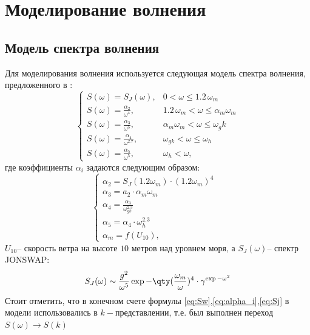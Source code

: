\section{Моделирование волнения}
\label{model}
\subsection{Модель спектра волнения}

Для моделирования волнения используется следующая модель спектра волнения, предложенного в \cite{Karaev2}: 
\begin{equation}
	\label{eq:Sw}
	\begin{cases}
		S(\omega)=S_J(\omega), &  0<\omega\leq 1.2\,\omega_m\\
		S(\omega)= \frac{\alpha_2}{\omega^4}, &  1.2 \,\omega_m < \omega \leq \alpha_m \omega_m\\
		S(\omega)= \frac{\alpha_3}{\omega^5}, &   \alpha_m \omega_m< \omega \leq \omega_gk\\
		S(\omega)= \frac{\alpha_4}{\omega^{2.7}}, & \omega_{gk}<\omega\leq \omega_h\\
		S(\omega)= \frac{\alpha_5}{\omega^5}, & \omega_h<\omega,
	\end{cases}
\end{equation}
где коэффициенты $\alpha_i$ задаются следующим образом:
\begin{equation}
	\label{eq:alpha_i}
	\begin{cases}
		\alpha_2=S_J(1.2 \omega_m)\cdot (1.2 \omega_m)^4 \\
		\alpha_3=a_2\cdot \alpha_m \omega_m \\
		\alpha_4= \frac{\alpha_3}{\omega^{2.3}_{gk}} \\
		\alpha_5 = \alpha_4 \cdot \omega_h^{2.3} \\
		\alpha_m = f(U_{10}), & 
	\end{cases}
\end{equation}
$U_{10} \text{-- скорость ветра на высоте 10 метров над уровнем моря,}$ а $S_J(\omega)$-- спектр JONSWAP:
\begin{equation}
\label{eq:Sj}
	S_J(\omega)\sim \frac{g^2}{\omega^{5}}\exp{-\qty(\frac{\omega_m}{\omega})^4}
	\cdot \gamma^{\exp{-\omega^2}}
\end{equation}
Стоит отметить, что в конечном счете формулы \eqref{eq:Sw},\eqref{eq:alpha_i},\eqref{eq:Sj} в модели использовались в $k-$представлении, т.е.  был выполнен переход $S(\omega)\rightarrow S(k)$

